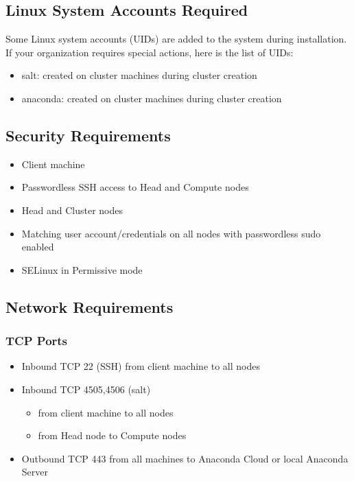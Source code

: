 \documentclass[letterpaper,10pt,openany,oneside]{sphinxmanual}
\begin{document}
\subsection{Linux System Accounts Required}
\label{AnacondaCluster:linux-system-accounts-required}
Some Linux system accounts (UIDs) are added to the system during installation.
If your organization requires special actions, here is the list of UIDs:
\begin{itemize}
\item {} 
salt: created on cluster machines during cluster creation

\item {} 
anaconda: created on cluster machines during cluster creation

\end{itemize}


\subsection{Security Requirements}
\label{AnacondaCluster:security-requirements}\begin{itemize}
\item {} 
Client machine

\item {} 
Passwordless SSH access to Head and Compute nodes

\item {} 
Head and Cluster nodes

\item {} 
Matching user account/credentials on all nodes with passwordless sudo
enabled

\item {} 
SELinux in Permissive mode

\end{itemize}


\subsection{Network Requirements}
\label{AnacondaCluster:network-requirements}

\subsubsection{TCP Ports}
\label{AnacondaCluster:tcp-ports}\begin{itemize}
\item {} 
Inbound TCP 22 (SSH) from client machine to all nodes

\item {} 
Inbound TCP 4505,4506 (salt)
\begin{itemize}
\item {} 
from client machine to all nodes

\item {} 
from Head node to Compute nodes

\end{itemize}

\item {} 
Outbound TCP 443 from all machines to Anaconda Cloud or local
Anaconda Server

\end{itemize}
\end{document}
